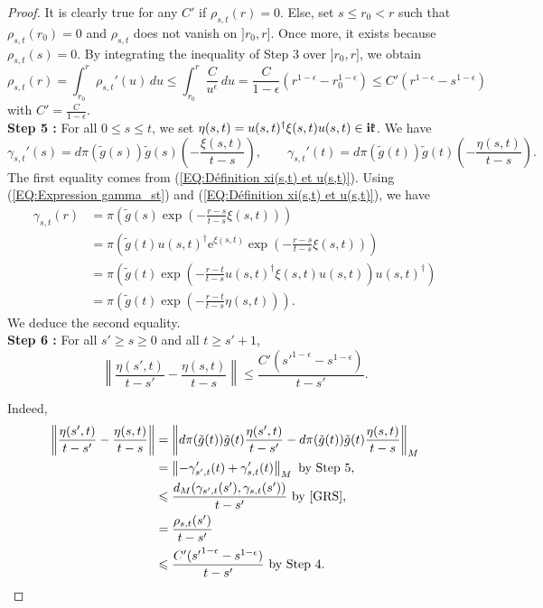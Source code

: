 \documentclass{article}
\theoremstyle{remark}
\theoremstyle{definition}
\renewcommand{\i}{\boldsymbol{\mathrm{i}}}
\newcommand{\e}{\boldsymbol{\mathrm{e}}}
\newcommand{\norme}[1]{\left\| #1 \right\|}
\renewcommand{\leq}{\leqslant}
\renewcommand{\geq}{\geqslant}
\begin{document}
\begin{proof}
It is clearly true for any $C'$ if $\rho_{s,t}(r) = 0$. Else, set $s \leq r_0 < r$ such that $\rho_{s,t}(r_0) = 0$ and $\rho_{s,t}$ does not vanish on $]r_0,r]$. Once more, it exists because $\rho_{s,t}(s) = 0$. By integrating the inequality of Step 3 over $]r_0,r]$, we obtain
$$
\rho_{s,t}(r) = \int_{r_0}^r \rho_{s,t}'(u) \, du \leq \int_{r_0}^r \frac{C}{u^\epsilon} \, du = \frac{C}{1 - \epsilon}(r^{1 - \epsilon} - r_0^{1 - \epsilon}) \leq C'(r^{1 - \epsilon} - s^{1 - \epsilon})
$$
with $C' = \frac{C}{1 - \epsilon}$.\\

\noindent\textbf{Step 5 :} For all $0 \leq s \leq t$, we set $\eta(s,t) = u(s,t)^\dagger\xi(s,t)u(s,t) \in \i\frak{k}$. We have
$$
\gamma_{s,t}'(s) = d\pi(\tilde{g}(s))\tilde{g}(s)\left(-\frac{\xi(s,t)}{t - s}\right), \qquad \gamma_{s,t}'(t) = d\pi(\tilde{g}(t))\tilde{g}(t)\left(-\frac{\eta(s,t)}{t - s}\right).
$$
The first equality comes from (\ref{EQ:Définition xi(s,t) et u(s,t)}). Using (\ref{EQ:Expression gamma_st}) and (\ref{EQ:Définition xi(s,t) et u(s,t)}), we have
\begin{align*}
    \gamma_{s,t}(r) & = \pi\left(\tilde{g}(s)\exp\left(-\frac{r - s}{t - s}\xi(s,t)\right)\right)\\
    & = \pi\left(\tilde{g}(t)u(s,t)^\dagger\e^{\xi(s,t)}\exp\left(-\frac{r - s}{t - s}\xi(s,t)\right)\right)\\
    & = \pi\left(\tilde{g}(t)\exp\left(-\frac{r - t}{t - s}u(s,t)^\dagger\xi(s,t)u(s,t)\right)u(s,t)^\dagger\right)\\
    & = \pi\left(\tilde{g}(t)\exp\left(-\frac{r - t}{t - s}\eta(s,t)\right)\right).
\end{align*}
We deduce the second equality.\\

\noindent\textbf{Step 6 :} For all $s' \geq s \geq 0$ and all $t \geq s' + 1$,
$$
\norme{\frac{\eta(s',t)}{t - s'} - \frac{\eta(s,t)}{t - s}} \leq \frac{C'({s'}^{1 - \epsilon} - s^{1 - \epsilon})}{t - s'}.
$$

Indeed,
\begin{align*}
    \norme{\frac{\eta(s',t)}{t - s'} - \frac{\eta(s,t)}{t - s}} & = \norme{d\pi(\tilde{g}(t))\tilde{g}(t)\frac{\eta(s',t)}{t - s'} - d\pi(\tilde{g}(t))\tilde{g}(t)\frac{\eta(s,t)}{t - s}}_M\\
    & = \norme{-\gamma_{s',t}'(t) + \gamma_{s,t}'(t)}_M \textrm{ by Step 5,}\\
    & \leq \frac{d_M(\gamma_{s',t}(s'),\gamma_{s,t}(s'))}{t - s'} \textrm{ by \cite[Lemma A.4]{GRS},}\\
    & = \frac{\rho_{s,t}(s')}{t - s'}\\
    & \leq \frac{C'({s'}^{1 - \epsilon} - s^{1 - \epsilon})}{t - s'} \textrm{ by Step 4.}
\end{align*}


\end{proof}
\end{document}
